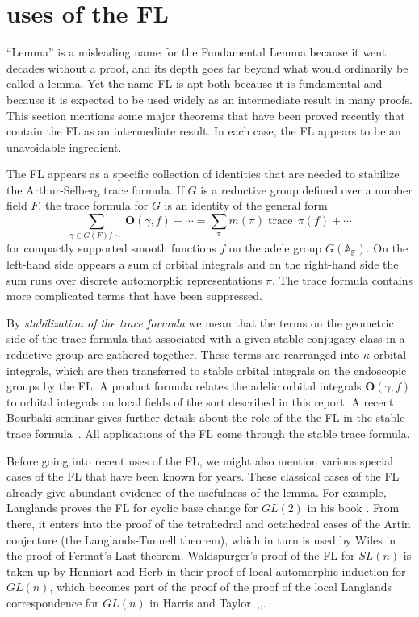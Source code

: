 \documentclass[brochure,english,12pt]{bourbaki}
\def\op#1{{\operatorname{#1}}}
\newcommand{\ring}[1]{\mathbb{#1}}
\def\OO{{\mathbf O}}
\begin{document}
\section{uses of the FL}  \label{sec:uses}

``Lemma'' is a misleading name for the Fundamental Lemma because it went decades
without a proof, and its depth goes far beyond what would ordinarily be
called a lemma.  
Yet the name FL is apt both because it is fundamental and
because it is expected to be used widely as an intermediate result in
many proofs.  This section mentions some major
theorems that have been proved recently that contain the FL as an
intermediate result.  In each case, the FL appears to be
an unavoidable ingredient.

The FL appears as a specific collection of identities
that are needed to stabilize the Arthur-Selberg trace formula.  
If $G$ is a reductive group defined over a number field $F$, 
the trace formula for $G$ is an identity of the general form
\[
\sum_{\gamma\in G(F)/\sim} \OO(\gamma,f) +\cdots = \sum_\pi m(\pi) \op{trace}\, \pi(f) + \cdots
\]
for compactly supported smooth functions $f$ on the adele group
$G(\ring{A_F})$.  On the left-hand side appears a sum of orbital integrals
and on the right-hand side the sum runs over discrete automorphic
representations $\pi$.    The trace formula contains more complicated terms that have
been suppressed.

By {\it stabilization of the trace formula} we mean that the terms on
the geometric side of the trace formula that associated with a given
stable conjugacy class in a reductive group are gathered together.
These terms are rearranged into $\kappa$-orbital integrals, which are
then transferred to stable orbital integrals on the endoscopic groups
by the FL.  A product formula relates the adelic orbital integrals
$\OO(\gamma,f)$ to orbital integrals on local fields of the sort
described in this report.  A recent Bourbaki seminar gives further
details about the role of the the FL in the stable trace
formula~\cite{Dat:2004}.  All applications of the FL come through the
stable trace formula.

Before going into recent uses of the FL, we might also mention various
special cases of the FL that have been known for years.  These classical
cases of the FL already give abundant evidence of the usefulness of
the lemma.  For example, Langlands proves the FL for
cyclic base change for $GL(2)$ in his book \cite[Lemma~5.10]{LBC:1980}.
From there, it enters into the proof of the tetrahedral and
octahedral cases of the Artin conjecture (the Langlands-Tunnell theorem),
which in turn is used by Wiles in the proof of Fermat's Last theorem.
Waldspurger's proof of the FL for $SL(n)$ is taken up by Henniart and Herb in their
proof of local automorphic induction for $GL(n)$, which becomes part of the
proof of the proof of the local Langlands correspondence for $GL(n)$
in Harris and Taylor~\cite{Wald:1991},\cite{Herb:Autoinduct},\cite{Harris:Taylor:local}.  
\end{document}

